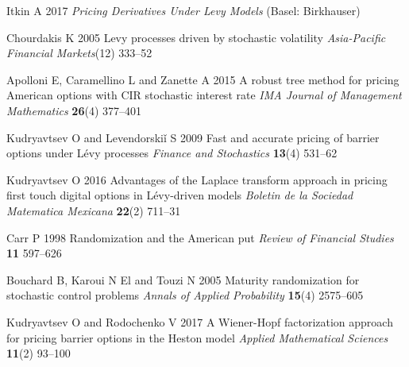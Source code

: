 \documentclass[a4paper]{jpconf}
\begin{document}
\begin{thebibliography}{18}
 Itkin A 2017 {\it Pricing Derivatives Under Levy Models} (Basel: Birkhauser) 

 Chourdakis K 2005 Levy processes driven by stochastic volatility {\it Asia-Pacific Financial Markets}(12) 333--52

 Apolloni E, Caramellino L and Zanette A 2015 A robust tree method for pricing American options with CIR stochastic interest rate {\it IMA Journal of Management Mathematics} {\bf 26}(4) 377--401

 Kudryavtsev O and Levendorski\v{i} S 2009 Fast and accurate pricing of barrier options under L\'evy processes {\it Finance and Stochastics} {\bf 13}(4) 531--62

 Kudryavtsev O 2016 Advantages of the Laplace transform approach in pricing first touch digital options in L\'evy-driven models {\it Boletin de la Sociedad Matematica Mexicana} {\bf 22}(2) 711--31

 Carr P 1998 Randomization and the American put {\it Review of Financial Studies} {\bf 11} 597--626

 Bouchard B, Karoui N El and Touzi N 2005 Maturity randomization for stochastic control problems  {\it Annals of Applied Probability} {\bf 15}(4) 2575--605

 Kudryavtsev O and Rodochenko V 2017 A Wiener-Hopf factorization approach for pricing barrier options in the Heston model {\it Applied Mathematical Sciences} {\bf 11}(2) 93--100

\end{thebibliography}
\end{document}
